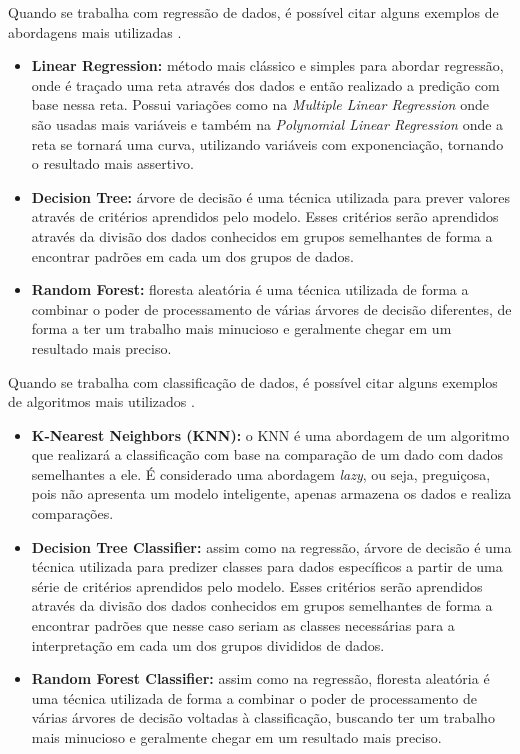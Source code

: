 Quando se trabalha com regressão de dados, é possível citar alguns exemplos de abordagens mais utilizadas \cite{machineLearningTensorFlow}.
\begin{itemize}
	\item \textbf{Linear Regression:} método mais clássico e simples para abordar regressão, onde é traçado uma reta através dos dados e então realizado a predição com base nessa reta. Possui variações como na \emph{Multiple Linear Regression} onde são usadas mais variáveis e também na \emph{Polynomial Linear Regression} onde a reta se tornará uma curva, utilizando variáveis com exponenciação, tornando o resultado mais assertivo.
	\item \textbf{Decision Tree:} árvore de decisão é uma técnica utilizada para prever valores através de critérios aprendidos pelo modelo. Esses critérios serão aprendidos através da divisão dos dados conhecidos em grupos semelhantes de forma a encontrar padrões em cada um dos grupos de dados.
	\item \textbf{Random Forest:} floresta aleatória é uma técnica utilizada de forma a combinar o poder de processamento de várias árvores de decisão diferentes, de forma a ter um trabalho mais minucioso e geralmente chegar em um resultado mais preciso.
\end{itemize}

Quando se trabalha com classificação de dados, é possível citar alguns exemplos de algoritmos mais utilizados \cite{machineLearningPython}.
\begin{itemize}
	\item \textbf{K-Nearest Neighbors (KNN):} o KNN é uma abordagem de um algoritmo que realizará a classificação com base na comparação de um dado com dados semelhantes a ele. É considerado uma abordagem \emph{lazy}, ou seja, preguiçosa, pois não apresenta um modelo inteligente, apenas armazena os dados e realiza comparações.
	\item \textbf{Decision Tree Classifier:} assim como na regressão, árvore de decisão é uma técnica utilizada para predizer classes para dados específicos a partir de uma série de critérios aprendidos pelo modelo. Esses critérios serão aprendidos através da divisão dos dados conhecidos em grupos semelhantes de forma a encontrar padrões que nesse caso seriam as classes necessárias para a interpretação em cada um dos grupos divididos de dados.
	\item \textbf{Random Forest Classifier:} assim como na regressão, floresta aleatória é uma técnica utilizada de forma a combinar o poder de processamento de várias árvores de decisão voltadas à classificação, buscando ter um trabalho mais minucioso e geralmente chegar em um resultado mais preciso.
\end{itemize}

